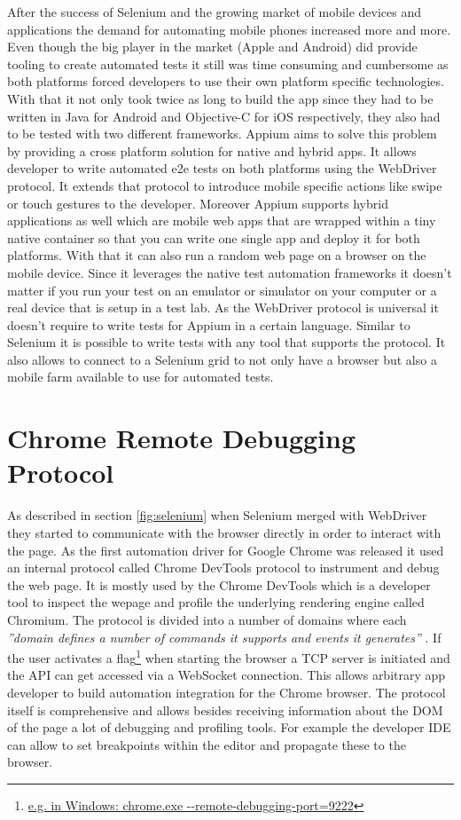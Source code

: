 After the success of Selenium and the growing market of mobile devices and applications the
demand for automating mobile phones increased more and more. Even though the big player in
the market (Apple and Android) did provide tooling to create automated tests it still was
time consuming and cumbersome as both platforms forced developers to use their own platform
specific technologies. With that it not only took twice as long to build the app since they had
to be written in Java for Android and Objective-C for iOS respectively, they also had to be
tested with two different frameworks. Appium aims to solve this problem by providing a cross
platform solution for native and hybrid apps. It allows developer to write automated e2e tests
on both platforms using the WebDriver protocol. It extends that protocol to introduce mobile
specific actions like swipe or touch gestures to the developer. Moreover Appium supports hybrid
applications as well which are mobile web apps that are wrapped within a tiny native container
so that you can write one single app and deploy it for both platforms. With that it can also
run a random web page on a browser on the mobile device. Since it leverages the native test
automation frameworks it doesn't matter if you run your test on an emulator or simulator on your
computer or a real device that is setup in a test lab. As the WebDriver protocol is universal
it doesn't require to write tests for Appium in a certain language. Similar to Selenium it is
possible to write tests with any tool that supports the protocol. It also allows to connect
to a Selenium grid to not only have a browser but also a mobile farm available to use for
automated tests.

\section{Chrome Remote Debugging Protocol}

As described in section \ref{fig:selenium} when Selenium merged with WebDriver they started
to communicate with the browser directly in order to interact with the page. As the first
automation driver for Google Chrome was released it used an internal protocol called Chrome
DevTools protocol to instrument and debug the web page. It is mostly used by the Chrome
DevTools which is a developer tool to inspect the wepage and profile the underlying rendering
engine called Chromium. The protocol is divided into a number of domains where each
\textit{''domain defines a number of commands it supports and events it generates''}
\cite{devtoolsprotocol}. If the user activates a flag\footnote{\url{e.g. in Windows:
chrome.exe --remote-debugging-port=9222}} when starting the browser a TCP server is initiated
and the API can get accessed via a WebSocket connection. This allows arbitrary app developer
to build automation integration for the Chrome browser. The protocol itself is comprehensive
and allows besides receiving information about the DOM of the page a lot of debugging and
profiling tools. For example the developer IDE can allow to set breakpoints within the editor
and propagate these to the browser.

